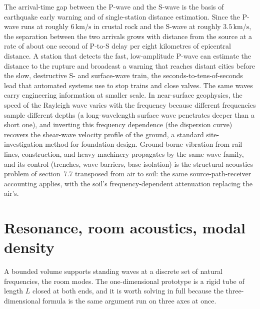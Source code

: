 The arrival-time gap between the P-wave and the S-wave is the basis of
earthquake early warning and of single-station distance estimation. Since
the P-wave runs at roughly $6\,\si{\kilo\meter\per\second}$ in crustal
rock and the S-wave at roughly $3.5\,\si{\kilo\meter\per\second}$, the
separation between the two arrivals grows with distance from the source at
a rate of about one second of P-to-S delay per eight kilometres of epicentral
distance. A station that detects the fast, low-amplitude P-wave can
estimate the distance to the rupture and broadcast a warning that reaches
distant cities before the slow, destructive S- and surface-wave train, the
seconds-to-tens-of-seconds lead that automated systems use to stop trains
and close valves. The same waves carry engineering information at smaller
scale. In near-surface geophysics, the speed of the Rayleigh wave varies
with the frequency because different frequencies sample different depths (a
long-wavelength surface wave penetrates deeper than a short one), and
inverting this frequency dependence (the dispersion curve) recovers the
shear-wave velocity profile of the ground, a standard site-investigation
method for foundation design. Ground-borne vibration from rail lines,
construction, and heavy machinery propagates by the same wave family, and
its control (trenches, wave barriers, base isolation) is the
structural-acoustics problem of section~7.7 transposed from air to soil:
the same source-path-receiver accounting applies, with the soil's
frequency-dependent attenuation replacing the air's.

\section{Resonance, room acoustics, modal density}

A bounded volume supports standing waves at a discrete set of
natural frequencies, the room modes. The one-dimensional prototype is
a rigid tube of length $L$ closed at both ends, and it is worth solving
in full because the three-dimensional formula is the same argument run on
three axes at once.

